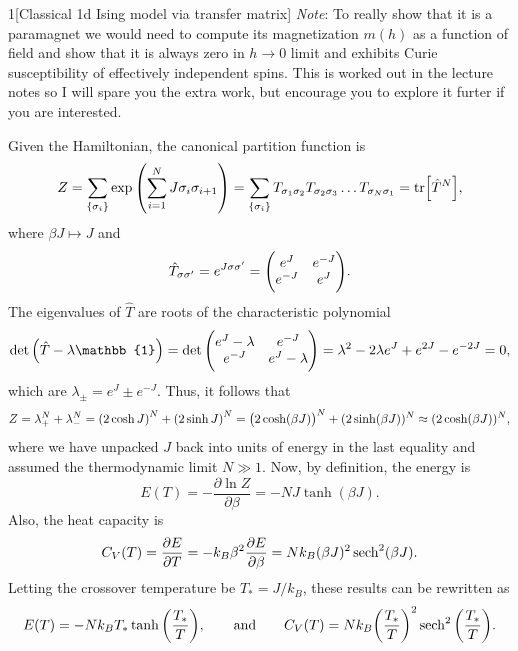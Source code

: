 \documentclass[12pt]{article}
\begin{document}
\begin{problem}{1}[Classical 1d Ising model via transfer matrix]
\textit{Note}: To really show that it is a paramagnet we would need to compute
its magnetization $m(h)$ as a function of field and show that it is always zero
in $h\to0$ limit and exhibits Curie susceptibility of effectively independent
spins. This is worked out in the lecture notes so I will spare you the extra
work, but encourage you to explore it furter if you are interested.
\begin{solution}
Given the Hamiltonian, the canonical partition function is
\begin{equation}
    Z=\sum_\qty{\sigma_i}\exp\qty(\sum_{i=1}^NJ\sigma_i\sigma_{i+1}) 
    =\sum_\qty{\sigma_i}T_{\sigma_1\sigma_2}T_{\sigma_2\sigma_3}\hdots
    T_{\sigma_N\sigma_1}
    =\tr[\hat{T}^N],
\end{equation}
where $\beta J\mapsto J$ and
\begin{equation}
    \hat{T}_{\sigma\sigma'}=e^{J\sigma\sigma'}=\mqty(e^J&e^{-J}\\e^{-J}&e^J).
\end{equation}
The eigenvalues of $\hat{T}$ are roots of the characteristic polynomial
\begin{equation}
    \det\qty(\hat{T}-\lambda\mathbb{1}) 
    =\det\mqty(e^{J}-\lambda&e^{-J}\\e^{-J}&e^J-\lambda)
    =\lambda^2-2\lambda e^J+e^{2J}-e^{-2J}=0,
\end{equation}
which are $\lambda_\pm=e^J\pm e^{-J}$. Thus, it follows that
\begin{equation}
    Z=\lambda_+^N+\lambda_-^N=\qty(2\cosh J)^N+\qty(2\sinh
    J)^N=\qty(2\cosh(\beta J))^N+(2\sinh(\beta J))^N
    \approx (2\cosh(\beta J))^N,
\end{equation}
where we have unpacked $J$ back into units of energy in the last equality and
assumed the thermodynamic limit $N\gg 1$. Now, by definition, the energy is
\begin{equation}
    E(T)=-\frac{\partial\ln Z}{\partial\beta}
    =-NJ\tanh(\beta J).
\end{equation}
Also, the heat capacity is
\begin{equation}
    C_V(T)=\frac{\partial E}{\partial T}
    =-k_B\beta^2\frac{\partial E}{\partial\beta}=Nk_B(\beta J)^2\sech^2(\beta
    J).
\end{equation}
Letting the crossover temperature be $T_\ast=J/k_B$, these results can be
rewritten as
\begin{equation}
    E(T)=-Nk_BT_\ast\tanh\qty(\frac{T_\ast}{T}),\qquad\t{and}\qquad
    C_V(T)=Nk_B\qty(\frac{T_\ast}{T})^2\sech^2\qty(\frac{T_\ast}{T}).

\end{equation}
\end{solution}
\end{problem}
\end{document}
